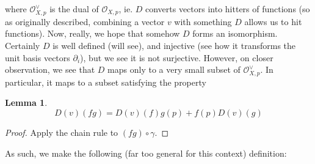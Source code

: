 \documentclass{article}
\theoremstyle{definition}
\newtheorem{lemma}{Lemma}
\begin{document}
where $\mathcal{O}^\vee_{X, p}$ is the dual of $\mathcal{O}_{X, p}$, ie. $D$
converts vectors into hitters of functions (so as originally described,
combining a vector $v$ with something $D$ allows us to hit functions). Now,
really, we hope that somehow $D$ forms an isomorphism. Certainly $D$ is well
defined (will see), and injective (see how it transforms the unit basis vectors
$\partial_i$), but we see it is not surjective. However, on closer observation,
we see that $D$ maps only to a very small subset of $\mathcal{O}^\vee_{X, p}$.
In particular, it maps to a subset satisfying the property

\begin{lemma}
$$ D(v)(fg) = D(v)(f) g(p) + f(p) D(v)(g) $$
\end{lemma}
\begin{proof}
Apply the chain rule to $(fg) \circ \gamma$.
\end{proof}

As such, we make the following (far too general for this context) definition:
\end{document}
